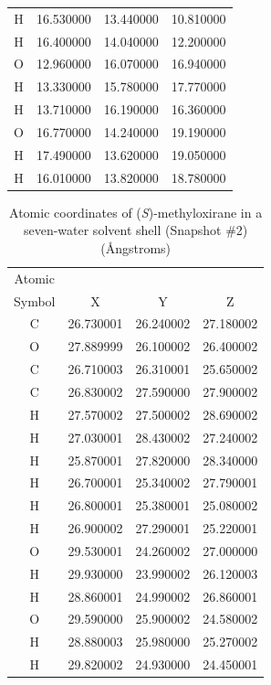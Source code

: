 \begin{table}[!ht]
\begin{tabular}{ c c c c }
	H &  16.530000 &  13.440000 &  10.810000 \\
	H &  16.400000 &  14.040000 &  12.200000 \\
	O &  12.960000 &  16.070000 &  16.940000 \\
	H &  13.330000 &  15.780000 &  17.770000 \\
	H &  13.710000 &  16.190000 &  16.360000 \\
	O &  16.770000 &  14.240000 &  19.190000 \\
	H &  17.490000 &  13.620000 &  19.050000 \\
	H &  16.010000 &  13.820000 &  18.780000 \\
    \hline
    \hline
    \end{tabular}
\end{table}
\begin{table}
    \centering
    \caption{Atomic coordinates of (\textit{S})-methyloxirane in a seven-water solvent shell (Snapshot \#2)
 (\AA ngstroms)}
    \label{metox2_7}
    \begin{tabular}{ c c c c }
    \hline
    \hline
    Atomic & & & \\
    Symbol & X & Y & Z \\
    \hline
	C &  26.730001 &  26.240002 &  27.180002 \\
	O &  27.889999 &  26.100002 &  26.400002 \\
	C &  26.710003 &  26.310001 &  25.650002 \\
	C &  26.830002 &  27.590000 &  27.900002 \\
	H &  27.570002 &  27.500002 &  28.690002 \\
	H &  27.030001 &  28.430002 &  27.240002 \\
	H &  25.870001 &  27.820000 &  28.340000 \\
	H &  26.700001 &  25.340002 &  27.790001 \\
	H &  26.800001 &  25.380001 &  25.080002 \\
	H &  26.900002 &  27.290001 &  25.220001 \\
	O &  29.530001 &  24.260002 &  27.000000 \\
	H &  29.930000 &  23.990002 &  26.120003 \\
	H &  28.860001 &  24.990002 &  26.860001 \\
	O &  29.590000 &  25.900002 &  24.580002 \\
	H &  28.880003 &  25.980000 &  25.270002 \\
	H &  29.820002 &  24.930000 &  24.450001 \\

\end{tabular}
\end{table}
